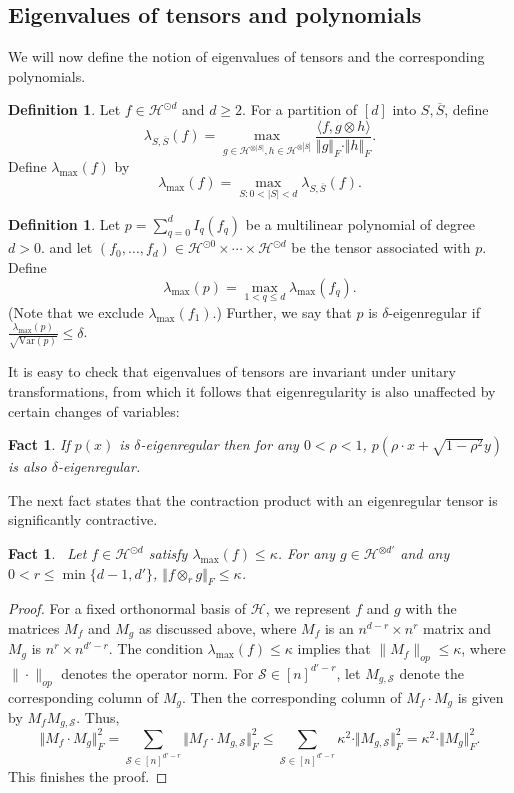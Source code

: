 \documentclass[11pt]{article}
\numberwithin{equation}{section}
\newtheorem{fact}[theorem]{Fact}
\theoremstyle{definition}
\newtheorem{definition}[theorem]{Definition}
\theoremstyle{plain}
\newcommand{\Var}{\mathrm{Var}}
\begin{document}
\subsection{Eigenvalues of tensors and polynomials}
We will now define the notion of eigenvalues of tensors and the corresponding polynomials. 
\begin{definition}
Let $f \in \mathcal{H}^{\odot d}$ and $d \ge 2$. For a partition of $[d]$ into $S, \overline{S}$, define
$$
\lambda_{S, \overline{S}}(f) = \max_{g \in \mathcal{H}^{\otimes |S|}, h \in \mathcal{H}^{\otimes |\overline{S}|}} \frac{\langle f, g \otimes h \rangle}{\Vert g \Vert_F \cdot \Vert h \Vert_F}.
$$
Define $\lambda_{\max}(f)$ by
$$
\lambda_{\max}(f) = \max_{S: 0< |S|< d} \lambda_{S, \overline{S}} (f). 
$$
\end{definition}

\begin{definition}\label{def:eigen-tensor}
    Let $p = \sum_{q=0}^d I_q(f_q)$ be a multilinear polynomial of
degree $d>0$.  and let $(f_0, \ldots, f_d) \in \mathcal{H}^{\odot 0} \times
\cdots \times \mathcal{H}^{\odot d}$ be the tensor associated with $p$. Define
$$
\lambda_{\max}(p)  = \max_{1 < q \le d} \lambda_{\max}(f_q). 
$$
(Note that we exclude $\lambda_{\max}(f_1)$.)
Further, we say that $p$ is $\delta$-eigenregular if $\frac{\lambda_{\max}(p)}{\sqrt{\Var(p)}} \le \delta$. 
\end{definition}

It is easy to check that eigenvalues of tensors are invariant under unitary transformations, from which it follows that
eigenregularity is also unaffected by certain changes of variables:
\begin{fact}
If $p(x)$ is $\delta$-eigenregular then for any $0 < \rho < 1$,  $p(\rho \cdot x + \sqrt{1-\rho^2} y)$ is also $\delta$-eigenregular. 
\end{fact}
The next fact states that the contraction product with an eigenregular tensor is significantly contractive. 
\begin{fact}~\label{fact:contraction1}
Let $f \in \mathcal{H}^{\odot d}$  satisfy $\lambda_{\max} (f) \le \kappa$. For any $g \in \mathcal{H}^{\otimes d'}$ and any $0< r \le \min \{ d-1,d' \}$, 
$\Vert f \otimes_r g \Vert_F \le \kappa$. 
\end{fact}
\begin{proof}
    For a fixed orthonormal basis of $\mathcal{H}$, we represent $f$ and $g$
    with the matrices $M_f$ and $M_g$ as discussed above, where $M_f$ is an
    $n^{d-r} \times n^{r}$ matrix and $M_g$ is $n^r \times n^{d'-r}$.
    The condition $\lambda_{\max}(f) \le \kappa$ implies that $\|M_f\|_{op} \le \kappa$,
    where $\|\cdot\|_{op}$ denotes the operator norm.
For
$\mathcal{S} \in [n]^{d'-r}$, let $M_{g, \mathcal{S}}$ denote the
corresponding column of $M_{g}$. Then the corresponding column of
$M_f \cdot M_g$ is given by $M_f M_{g, \mathcal{S}}$. Thus, 
\[
\Vert M_f \cdot M_g \Vert_F^2  = \sum_{\mathcal{S} \in [n]^{d'-r}} \Vert M_f \cdot  M_{g, \mathcal{S}} \Vert_F^2 \le \sum_{\mathcal{S} \in [n]^{d'-r}} \kappa^2 \cdot \Vert M_{g, \mathcal{S}} \Vert_F^2 = \kappa^2 \cdot \Vert M_g \Vert_F^2.
\]
This finishes the proof. 
\end{proof}
\end{document}
